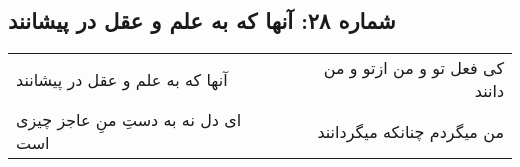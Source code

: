 \begin{center}
\section*{شماره ۲۸: آنها که به علم و عقل در پیشانند}
\label{sec:028}
\begin{longtable}{l p{0.5cm} r}
آنها که به علم و عقل در پیشانند
&&
کی فعل تو و من ازتو و من دانند
\\
ای دل نه به دستِ منِ عاجز چیزی است
&&
من میگردم چنانکه میگردانند
\\
\end{longtable}
\end{center}
